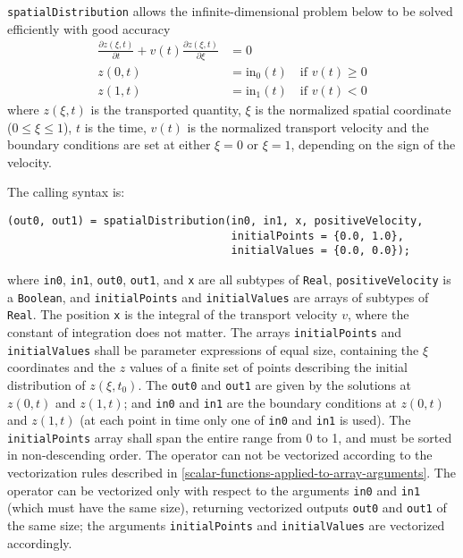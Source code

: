 \lstinline!spatialDistribution! allows the infinite-dimensional problem below to be solved efficiently with good accuracy
\begin{align*}
\frac{\partial z(\xi, t)}{\partial t} + v(t) \frac{\partial z(\xi, t)}{\partial \xi} &= 0\\
z(0, t) &= \mathrm{in}_{0}(t) \quad \text{if $v(t) \geq 0$}\\
z(1, t) &= \mathrm{in}_{1}(t) \quad \text{if $v(t) < 0$}
\end{align*}
where $z(\xi, t)$ is the transported quantity, $\xi$ is the normalized spatial coordinate ($0 \le \xi \le 1$), $t$ is the time, $v(t)$ is the normalized transport velocity and the boundary conditions are set at either $\xi = 0$ or $\xi = 1$, depending on the sign of the velocity.

The calling syntax is:
\begin{lstlisting}[language=modelica]
(out0, out1) = spatialDistribution(in0, in1, x, positiveVelocity,
                                   initialPoints = {0.0, 1.0},
                                   initialValues = {0.0, 0.0});
\end{lstlisting}
where \lstinline!in0!, \lstinline!in1!, \lstinline!out0!, \lstinline!out1!, and \lstinline!x! are all subtypes of \lstinline!Real!, \lstinline!positiveVelocity! is a \lstinline!Boolean!, and \lstinline!initialPoints! and \lstinline!initialValues! are arrays of subtypes of \lstinline!Real!.
The position \lstinline!x! is the integral of the transport velocity $v$, where the constant of integration does not matter.
The arrays \lstinline!initialPoints! and \lstinline!initialValues! shall be parameter expressions of equal size, containing the $\xi$ coordinates and the $z$ values of a finite set of points describing the initial distribution of $z(\xi, t_{0})$.
The \lstinline!out0! and \lstinline!out1! are given by the solutions at $z(0, t)$ and $z(1, t)$; and \lstinline!in0! and \lstinline!in1! are the boundary conditions at $z(0, t)$ and $z(1, t)$ (at each point in time only one of \lstinline!in0! and \lstinline!in1! is used).
The \lstinline!initialPoints! array shall span the entire range from 0 to 1, and must be sorted in non-descending order.
The operator can not be vectorized according to the vectorization rules described in \cref{scalar-functions-applied-to-array-arguments}.
The operator can be vectorized only with respect to the arguments \lstinline!in0! and \lstinline!in1! (which must have the same size), returning vectorized outputs \lstinline!out0! and \lstinline!out1! of the same size; the arguments \lstinline!initialPoints! and \lstinline!initialValues! are vectorized accordingly.

